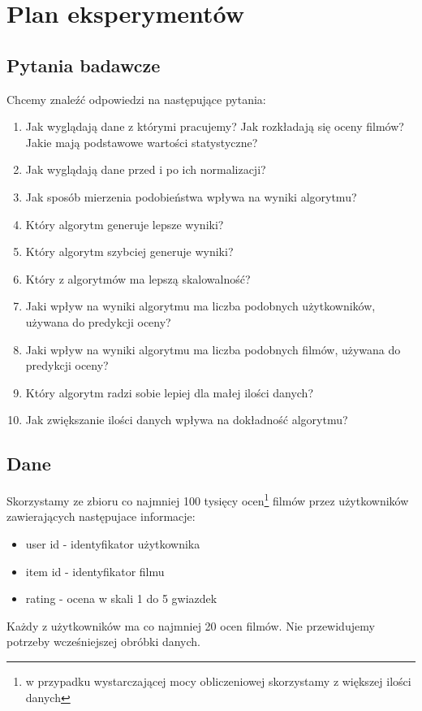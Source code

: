 \documentclass[12pt, a4paper]{article}
\begin{document}
\section{Plan eksperymentów}

\subsection{Pytania badawcze}
Chcemy znaleźć odpowiedzi na następujące pytania:

\begin{enumerate}
\item Jak wyglądają dane z którymi pracujemy? Jak rozkładają się oceny filmów? Jakie mają podstawowe wartości statystyczne?
\item Jak wyglądają dane przed i po ich normalizacji?
\item Jak sposób mierzenia podobieństwa wpływa na wyniki algorytmu?
\item Który algorytm generuje lepsze wyniki?
\item Który algorytm szybciej generuje wyniki?
\item Który z algorytmów ma lepszą skalowalność?
\item Jaki wpływ na wyniki algorytmu ma liczba podobnych użytkowników, używana do predykcji oceny?
\item Jaki wpływ na wyniki algorytmu ma liczba podobnych filmów, używana do predykcji oceny?
\item Który algorytm radzi sobie lepiej dla małej ilości danych?
\item Jak zwiększanie ilości danych wpływa na dokładność algorytmu?
\end{enumerate}

\subsection{Dane}
Skorzystamy ze zbioru co najmniej 100 tysięcy ocen\footnote{w przypadku wystarczającej mocy
obliczeniowej skorzystamy z większej ilości danych} filmów przez użytkowników zawierających
następujace informacje:

\begin{itemize}
\item user id - identyfikator użytkownika
\item item id - identyfikator filmu
\item rating - ocena w skali 1 do 5 gwiazdek
\end{itemize}

Każdy z użytkowników ma co najmniej 20 ocen filmów. Nie przewidujemy potrzeby wcześniejszej obróbki danych.
\end{document}
